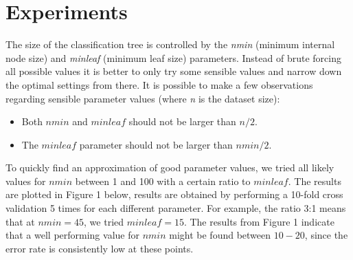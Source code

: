 \documentclass[a4paper,12pt]{scrartcl}
\begin{document}
\section{Experiments}
The size of the classification tree is controlled by the \textit{nmin} (minimum internal node size) and \textit{minleaf} (minimum leaf size) parameters. Instead of brute forcing all possible values it is better to only try some sensible values and narrow down the optimal settings from there. It is possible to make a few observations regarding sensible parameter values (where \textit{n} is the dataset size): 
    \begin{itemize}
        \item Both $nmin$ and $minleaf$ should not be larger than $n/2$.
        \item The $minleaf$ parameter should not be larger than $nmin/2$. 
    \end{itemize}
To quickly find an approximation of good parameter values, we tried all likely values for $nmin$ between 1 and 100 with a certain ratio to $minleaf$. The results are plotted in Figure 1 below, results are obtained by performing a 10-fold cross validation 5 times for each different parameter. For example, the ratio 3:1 means that at $nmin = 45$, we tried $minleaf = 15$. The results from Figure 1 indicate that a well performing value for $nmin$ might be found between $10-20$, since the error rate is consistently low at these points. 
 
\end{document}
